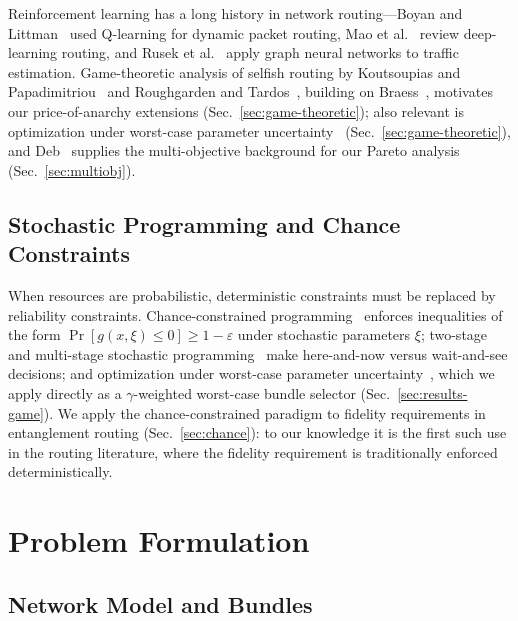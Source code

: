 \documentclass[twocolumn]{article}
\begin{document}
Reinforcement learning has a long history in network routing---Boyan
and Littman~\cite{boyan1993packet} used Q-learning for dynamic packet
routing, Mao et al.~\cite{mao2017routing} review deep-learning routing,
and Rusek et al.~\cite{rusek2020routenets} apply graph neural networks
to traffic estimation.  Game-theoretic analysis of selfish routing by
Koutsoupias and Papadimitriou~\cite{koutsoupias1999worst} and
Roughgarden and Tardos~\cite{roughgarden2002bad}, building on
Braess~\cite{braess1968paradoxon}, motivates our price-of-anarchy
extensions (Sec.~\ref{sec:game-theoretic}); also relevant is
optimization under worst-case parameter
uncertainty~\cite{bertsimas2004price,ben-tal2009robust}
(Sec.~\ref{sec:game-theoretic}), and Deb~\cite{deb2001multiobjective}
supplies the multi-objective background for our Pareto analysis
(Sec.~\ref{sec:multiobj}).

\subsection{Stochastic Programming and Chance Constraints}
\label{sec:related-chance}

When resources are probabilistic, deterministic constraints must be
replaced by reliability constraints.  Chance-constrained
programming~\cite{charnes1959chance,prekopa1995stochastic} enforces
inequalities of the form $\Pr[g(x,\xi) \le 0] \ge 1-\varepsilon$ under
stochastic parameters $\xi$; two-stage and multi-stage stochastic
programming~\cite{birge1997introduction} make here-and-now versus
wait-and-see decisions; and optimization under worst-case parameter
uncertainty~\cite{bertsimas2004price,ben-tal2009robust}, which we
apply directly as a $\gamma$-weighted worst-case bundle selector
(Sec.~\ref{sec:results-game}).  We apply the chance-constrained
paradigm to fidelity requirements in entanglement routing
(Sec.~\ref{sec:chance}): to our knowledge it is the first such use in
the routing literature, where the fidelity requirement is
traditionally enforced deterministically.

\section{Problem Formulation}
\label{sec:qubo}

\subsection{Network Model and Bundles}
\label{sec:model}
\end{document}
